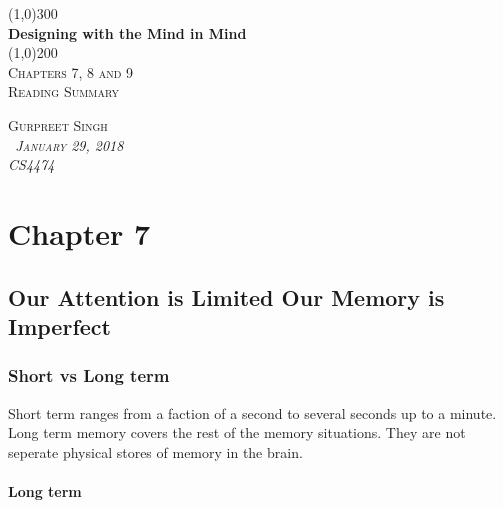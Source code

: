 \documentclass[11pt,]{article}
\let\oldparagraph\paragraph
\renewcommand{\paragraph}[1]{\oldparagraph{#1}\mbox{}}
\begin{document}
\begin{titlepage}
    \begin{center}
    \line(1,0){300} \\ 
    [0.25in]
    \huge{\bfseries Designing with the Mind in Mind} \\
    [2mm]
    \line(1,0){200} \\
    [1.5cm] 
    \textsc{\Large Chapters 7, 8 and 9} \\
    [0.75cm]
    \textsc{\Large Reading Summary} \\
    [12cm]
    \end{center}
    
    \begin{flushright}
    \textsc{\Large{Gurpreet Singh \\}\normalsize\emph{\ January 29, 2018 \\}\normalsize\emph{CS4474 \\} }
    
    \end{flushright}

\end{titlepage}

\newpage
\shipout\null

\hypertarget{chapter-7}{%
\section{Chapter 7}\label{chapter-7}}

\hypertarget{our-attention-is-limited-our-memory-is-imperfect}{%
\subsection{Our Attention is Limited Our Memory is
Imperfect}\label{our-attention-is-limited-our-memory-is-imperfect}}

\hypertarget{short-vs-long-term}{%
\subsubsection{Short vs Long term}\label{short-vs-long-term}}

Short term ranges from a faction of a second to several seconds up to a
minute. Long term memory covers the rest of the memory situations. They
are not seperate physical stores of memory in the brain.

\hypertarget{long-term}{%
\paragraph{Long term}\label{long-term}}
\end{document}
